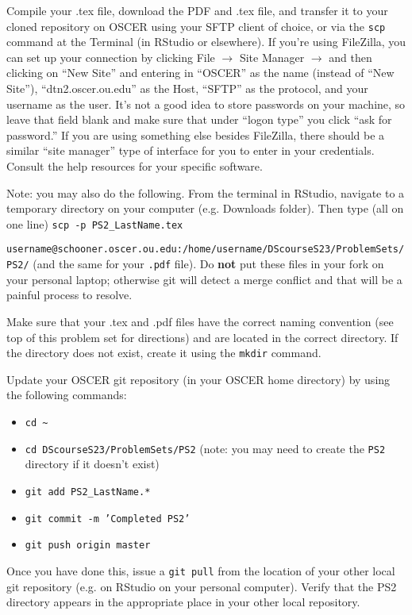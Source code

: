 \documentclass[12pt,english]{exam}
\begin{document}
\begin{questions}
\question Compile your .tex file, download the PDF and .tex file, and transfer it to your cloned repository on OSCER using your SFTP client of choice, or via the \texttt{scp} command at the Terminal (in RStudio or elsewhere). If you're using FileZilla, you can set up your connection by clicking File $\rightarrow$ Site Manager $\rightarrow$ and then clicking on ``New Site'' and entering in ``OSCER'' as the name (instead of ``New Site''), ``dtn2.oscer.ou.edu'' as the Host, ``SFTP'' as the protocol, and your username as the user. It's not a good idea to store passwords on your machine, so leave that field blank and make sure that under ``logon type'' you click ``ask for password.'' If you are using something else besides FileZilla, there should be a similar ``site manager'' type of interface for you to enter in your credentials. Consult the help resources for your specific software.

Note: you may also do the following. From the terminal in RStudio, navigate to a temporary directory on your computer (e.g. Downloads folder). Then type (all on one line) \texttt{scp -p PS2\_LastName.tex}\par \texttt{username@schooner.oscer.ou.edu:/home/username/DScourseS23/ProblemSets/PS2/} (and the same for your \texttt{.pdf} file). Do \textbf{not} put these files in your fork on your personal laptop; otherwise git will detect a merge conflict and that will be a painful process to resolve.

\question Make sure that your .tex and .pdf files have the correct naming convention (see top of this problem set for directions) and are located in the correct directory. If the directory does not exist, create it using the \texttt{mkdir} command.

\question Update your OSCER git repository (in your OSCER home directory) by using the following commands:
\begin{itemize}
    \item \texttt{cd \~}
    \item \texttt{cd DScourseS23/ProblemSets/PS2} (note: you may need to create the \texttt{PS2} directory if it doesn't exist)
    \item \texttt{git add PS2\_LastName.*}
    \item \texttt{git commit -m 'Completed PS2'}
    \item \texttt{git push origin master}
\end{itemize}
Once you have done this, issue a \texttt{git pull} from the location of your other local git repository (e.g. on RStudio on your personal computer). Verify that the PS2 directory appears in the appropriate place in your other local repository.


\end{questions}
\end{document}
